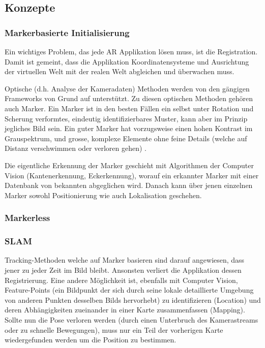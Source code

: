 \documentclass[a4paper]{scrreprt}
\begin{document}
\subsection{Konzepte}

\subsubsection{Markerbasierte Initialisierung}
Ein wichtiges Problem, das jede AR Applikation lösen muss, ist die Registration. Damit ist gemeint, dass die Applikation Koordinatensysteme und Ausrichtung der virtuellen Welt mit der realen Welt abgleichen und überwachen muss.

Optische (d.h. Analyse der Kameradaten) Methoden werden von den gängigen Frameworks von Grund auf unterstützt. Zu diesen optischen Methoden gehören auch Marker. Ein Marker ist in den besten Fällen ein selbst unter Rotation und Scherung verformtes, eindeutig identifizierbares Muster, kann aber im Prinzip jegliches Bild sein. Ein guter Marker hat vorzugsweise einen hohen Kontrast im Grauspektrum, und grosse, komplexe Elemente ohne feine Details (welche auf Distanz verschwimmen oder verloren gehen) \cite{Kudan2016}.

Die eigentliche Erkennung der Marker geschieht mit Algorithmen der Computer Vision (Kantenerkennung, Eckerkennung), worauf ein erkannter Marker mit einer Datenbank von bekannten abgeglichen wird. Danach kann über jenen einzelnen Marker sowohl Positionierung wie auch Lokalisation geschehen.

\subsubsection{Markerless}

\subsubsection{SLAM}
Tracking-Methoden welche auf Marker basieren sind darauf angewiesen, dass jener zu jeder Zeit im Bild bleibt. Ansonsten verliert die Applikation dessen Registrierung. Eine andere Möglichkeit ist, ebenfalls mit Computer Vision, Feature-Points (ein Bildpunkt der sich durch seine lokale detaillierte Umgebung von anderen Punkten desselben Bilds hervorhebt) zu identifizieren (Location) und deren Abhängigkeiten zueinander in einer Karte zusammenfassen (Mapping). Sollte nun die Pose verloren werden (durch einen Unterbruch des Kamerastreams oder zu schnelle Bewegungen), muss nur ein Teil der vorherigen Karte wiedergefunden werden um die Position zu bestimmen.
\end{document}
